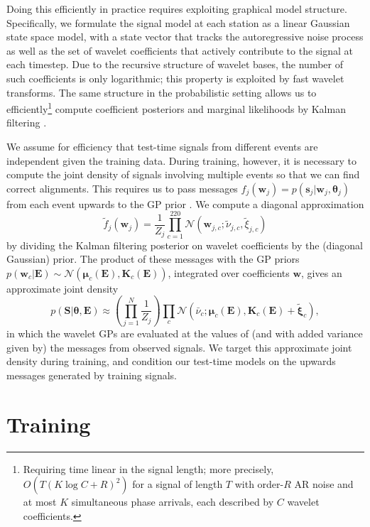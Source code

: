 \documentclass[twoside]{article} \usepackage{aistats2017}
\newcommand{\N}{\mathcal{N}}
\renewcommand{\v}[1]{\mathbf{#1}}
\begin{document}
Doing this efficiently in practice requires exploiting graphical model
structure. Specifically, we formulate the signal model at each station 
as a linear Gaussian state space model, with a state vector
that tracks the autoregressive noise process as well as the set of
wavelet coefficients that actively contribute to the signal at each
timestep.  Due to the recursive structure of wavelet bases, the number
of such coefficients is only logarithmic; this property is exploited by fast wavelet transforms. The
same structure in the
probabilistic setting allows us to efficiently\footnote{Requiring time linear in the signal length; more precisely,
  $O(T (K \log C + R)^2 )$ for a signal of length $T$ with order-$R$
  AR noise and at most $K$ simultaneous phase arrivals, each described
  by $C$ wavelet coefficients.} compute coefficient posteriors and
marginal likelihoods by Kalman filtering
\citep{grewal2014kalman}. 

We assume for efficiency that test-time signals from different
events are independent given the training data. During training, however, it is necessary to compute
the joint density of signals involving multiple events so that we can
find correct alignments. This requires us to
pass messages $f_j(\v{w}_j) =
p(\v{s}_j | \v{w}_j, \v{\theta}_j)$ from each event upwards to the GP
prior  \citep{koller2009probabilistic}. We compute a diagonal
approximation \[\tilde{f}_j(\v{w}_j) = \frac{1}{Z_j}\prod_{c=1}^{220} \N(\v{w}_{j,c};
\tilde{\nu}_{j,c}, \tilde{\xi}_{j,c})\] by dividing the Kalman
filtering posterior on wavelet coefficients by the (diagonal Gaussian)
prior. The product of these messages with the GP priors $p(\v{w}_c | \v{E})
\sim \N(\v{\mu}_c(\v{E}), \v{K}_c(\v{E}) )$, integrated over coefficients $\v{w}$, gives an approximate
joint density
\begin{equation}
p(\v{S} | \v{\theta}, \v{E}) \approx \left(\prod_{j=1}^N
  \frac{1}{Z_j} \right) \prod_c \N\left(\bar{\nu}_c; \v{\mu}_c(\v{E}),   \v{K}_c(\v{E}) + \v{\tilde{\xi}}_{c} \right)\label{eqn:efficient_joint_density},
\end{equation}
in which the wavelet GPs are evaluated at the values of (and
with added variance given by) the messages from observed signals. We target this
approximate joint density during training, and condition our test-time
models on the upwards messages generated by training signals. 

\section{Training}
\end{document}
